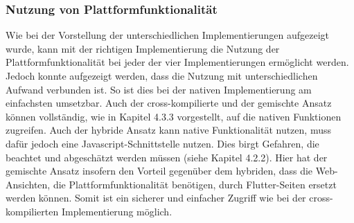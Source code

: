 \subsubsection{Nutzung von Plattformfunktionalität}
Wie bei der Vorstellung der unterschiedlichen Implementierungen aufgezeigt wurde, kann mit der richtigen Implementierung die Nutzung der Plattformfunktionalität bei jeder der vier Implementierungen ermöglicht werden. Jedoch konnte aufgezeigt werden, dass die Nutzung mit unterschiedlichen Aufwand verbunden ist. So ist dies bei der nativen Implementierung am einfachsten umsetzbar. Auch der cross-kompilierte und der gemischte Ansatz können vollständig, wie in Kapitel 4.3.3 vorgestellt, auf die nativen Funktionen zugreifen. Auch der hybride Ansatz kann native Funktionalität nutzen, muss dafür jedoch eine Javascript-Schnittstelle nutzen. Dies birgt Gefahren, die beachtet und abgeschätzt werden müssen (siehe Kapitel 4.2.2). Hier hat der gemischte Ansatz insofern den Vorteil gegenüber dem hybriden, dass die Web-Ansichten, die Plattformfunktionalität benötigen, durch Flutter-Seiten ersetzt werden können. Somit ist ein sicherer und einfacher Zugriff wie bei der cross-kompilierten Implementierung möglich.
